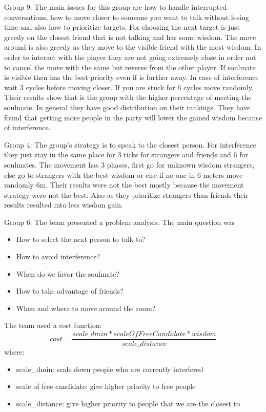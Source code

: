 Group 9:
The main issues for this group are how to handle interrupted conversations, how
to move closer to someone you want to talk without losing time and also how to
prioritize targets. For choosing the next target is just greedy on the closest
friend that is not talking and has some wisdom. The move around is also greedy 
as they move to the visible friend with the most wisdom. In order to interact with
the player they are not going extremely close in order not to cancel the move
with the same but reverse from the other player. If soulmate is visible then has
the best priority even if is further away. In case of interference wait 3 cycles
before moving closer. If you are stuck for 6 cycles move randomly. Their results
show that is the group with the higher percentage of meeting the soulmate. In 
general they have good distribution on their rankings. They have found that getting
more people in the party will lower the gained wisdom because of interference.

Group 4:
The group's strategy is to speak to the closest person. For interference they just
stay in the same place for 3 ticks for strangers and friends and 6 for soulmates.
The movement has 3 phases, first go for unknown wisdom strangers, else go to 
strangers with the best wisdom or else if no one in 6 meters move randomly 6m.
Their results were not the best mostly because the movement strategy were not the
best. Also as they prioritize strangers than friends their results resulted into 
less wisdom gain.

Group 6:
The team presented a problem analysis. The main question was 
\begin{itemize}
\item How to select the next person to talk to?
\item How to avoid interference?
\item When do we favor the soulmate?
\item How to take advantage of friends?
\item When and where to move around the room?
\end{itemize}

The team used a cost function:
\begin{equation*}
cost = \frac{scale\_dmin*scaleOfFreeCandidate*wisdom}{scale\_distance}
\end{equation*}
where:
\begin{itemize}
\item scale\_dmin: scale down people who are currently interfered
\item scale of free candidate: give higher priority to free people
\item scale\_distance: give higher priority to people that we are the closest to 
\end{itemize}

